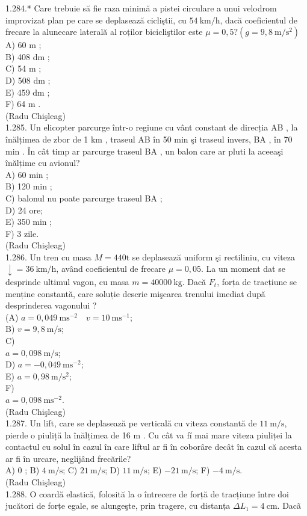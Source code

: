 \documentclass[10pt]{article}
\begin{document}
1.284.* Care trebuie să fie raza minimă a pistei circulare a unui velodrom improvizat plan pe care se deplasează cicliştii, cu $54 \mathrm{~km} / \mathrm{h}$, dacă coeficientul de frecare la alunecare laterală al roților bicicliştilor este $\mu=0,5 ?\left(g=9,8 \mathrm{~m} / \mathrm{s}^{2}\right)$\\
A) 60 m ;\\
B) 408 dm ;\\
C) 54 m ;\\
D) 508 dm ;\\
E) 459 dm ;\\
F) 64 m .\\
(Radu Chişleag)\\
1.285. Un elicopter parcurge într-o regiune cu vânt constant de direcția AB , la înălțimea de zbor de 1 km , traseul AB în 50 min şi traseul invers, BA , în 70 min . În cât timp ar parcurge traseul BA , un balon care ar pluti la aceeaşi înălțime cu avionul?\\
A) 60 min ;\\
B) 120 min ;\\
C) balonul nu poate parcurge traseul BA ;\\
D) 24 ore;\\
E) 350 min ;\\
F) 3 zile.\\
(Radu Chişleag)\\
1.286. Un tren cu masa $M=440 \mathrm{t}$ se deplasează uniform şi rectiliniu, cu viteza $\downarrow=36 \mathrm{~km} / \mathrm{h}$, având coeficientul de frecare $\mu=0,05$. La un moment dat se desprinde ultimul vagon, cu masa $m=40000 \mathrm{~kg}$. Dacă $F_{t}$, forța de tracțiune se menține constantă, care soluție descrie mişcarea trenului imediat după desprinderea vagonului ?\\
(A) $a=0,049 \mathrm{~ms}^{-2} \quad v=10 \mathrm{~ms}^{-1} ;$\\
B) $v=9,8 \mathrm{~m} / \mathrm{s}$;\\
C)\\
$a=0,098 \mathrm{~m} / \mathrm{s}$;\\
D) $a=-0,049 \mathrm{~ms}^{-2}$;\\
E) $a=0,98 \mathrm{~m} / \mathrm{s}^{2}$;\\
F)\\
$a=0,098 \mathrm{~ms}^{-2}$.\\
(Radu Chişleag)\\
1.287. Un lift, care se deplasează pe verticală cu viteza constantă de $11 \mathrm{~m} / \mathrm{s}$, pierde o piuliță la înălțimea de 16 m . Cu cât va fí mai mare viteza piuliței la contactul cu solul în cazul în care liftul ar fi în coborâre decât în cazul că acesta ar fi în urcare, neglijând frecările?\\
A) 0 ; B) $4 \mathrm{~m} / \mathrm{s}$; C) $21 \mathrm{~m} / \mathrm{s}$; D) $11 \mathrm{~m} / \mathrm{s}$; E) $-21 \mathrm{~m} / \mathrm{s}$; F) $-4 \mathrm{~m} / \mathrm{s}$.\\
(Radu Chişleag)\\
1.288. O coardă elastică, folosită la o întrecere de forță de tracțiune între doi jucători de forțe egale, se alungeşte, prin tragere, cu distanța $\Delta L_{1}=4 \mathrm{~cm}$. Dacã
\end{document}
